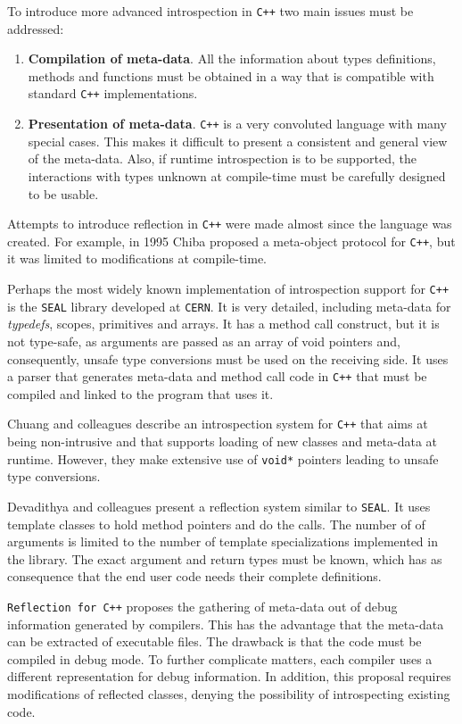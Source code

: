 To introduce more advanced introspection in \texttt{C++} two main issues must be addressed:

\begin{enumerate}
 \item \textbf{Compilation of meta-data}. All the information about types definitions, methods and functions must be obtained in a way that
is compatible with standard \texttt{C++} implementations.
 \item \textbf{Presentation of meta-data}. \texttt{C++} is a very convoluted language with many special cases. This makes it difficult to
 present a consistent and general view of the meta-data. Also, if runtime introspection is to be supported, the interactions
 with types unknown at compile-time must be carefully designed to be usable.
\end{enumerate}

Attempts to introduce reflection in \texttt{C++} were made almost since the language was created. For example, in 1995 Chiba \cite{Chiba95} proposed
a meta-object protocol for \texttt{C++}, but it was limited to modifications at compile-time. 

Perhaps the most widely known implementation of introspection support for \texttt{C++} is the \texttt{SEAL} \cite{seal} library developed at \texttt{CERN}. It is very
detailed, including meta-data for \emph{typedefs}, scopes, primitives and arrays. It has a method call construct, but it is not type-safe,
as arguments are passed as an array of void pointers and, consequently, unsafe type conversions must be used on the receiving side.
It uses a parser that generates meta-data and method call code in \texttt{C++} that must be compiled and linked to the program that uses it.

Chuang and colleagues \cite{Chuang} describe an introspection system for \texttt{C++} that aims at being non-intrusive and that supports
loading of new classes and meta-data at runtime. However, they make extensive use of \texttt{void*} pointers leading to unsafe type
conversions.

Devadithya and colleagues \cite{Devadithya} present a reflection system similar to \texttt{SEAL}. It uses template classes to hold method pointers
and do the calls. The number of of arguments is limited to the number of template specializations implemented in the library.
The exact argument and return types must be known, which has as consequence that the end user code needs their complete
definitions. 

\texttt{Reflection for C++} \cite{garret} proposes the gathering of meta-data out of debug information generated by compilers.
This has the advantage that the meta-data can be extracted of executable files. The drawback is that the code must be compiled
in debug mode. To further complicate matters, each compiler uses a different representation for debug information.
In addition, this proposal requires modifications of reflected classes, denying the possibility of introspecting existing code.

